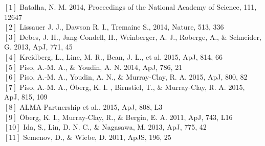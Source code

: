 \documentclass[12pt, letterpaper]{article}
\begin{document}



%
\FloatBarrier

\footnotesize
\noindent $[1]$ Batalha, N. M. 2014, Proceedings of the National Academy of Science, 111, 12647 \\
$[2]$ Lissauer J. J., Dawson R. I., Tremaine S., 2014, Nature, 513, 336 \\
$[3]$ Debes, J. H., Jang-Condell, H., Weinberger, A. J., Roberge, A., \& Schneider, G. 2013, ApJ, 771, 45 \\
$[4]$ Kreidberg, L., Line, M. R., Bean, J. L., et al. 2015, ApJ, 814, 66 \\
$[5]$ Piso, A.-M. A., \& Youdin, A. N. 2014, ApJ, 786, 21 \\
$[6]$ Piso, A.-M. A., Youdin, A. N., \& Murray-Clay, R. A. 2015, ApJ, 800, 82 \\
$[7]$ Piso, A.-M. A., \"Oberg, K. I. , Birnstiel, T., \& Murray-Clay, R. A. 2015, ApJ, 815, 109 \\
$[8]$ ALMA Partnership et al., 2015, ApJ, 808, L3 \\
$[9]$ \"Oberg, K. I., Murray-Clay, R., \& Bergin, E. A. 2011, ApJ, 743, L16 \\
$[10]$ Ida, S., Lin, D. N. C., \& Nagasawa, M. 2013, ApJ, 775, 42 \\
$[11]$ Semenov, D., \& Wiebe, D. 2011, ApJS, 196, 25

%
%


\end{document}
